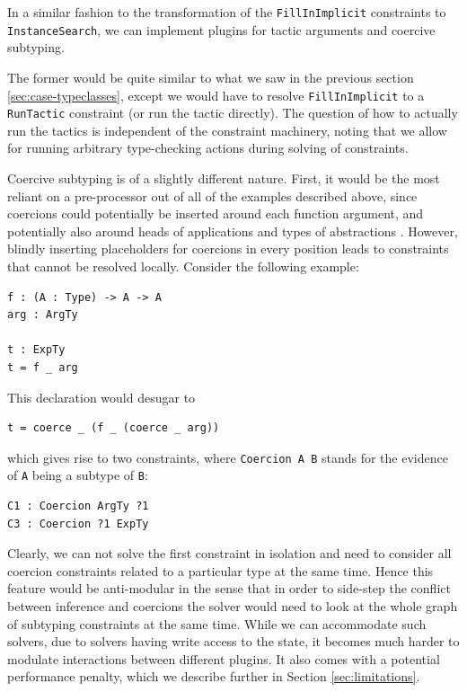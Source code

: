 In a similar fashion to the transformation of the
\texttt{FillInImplicit} constraints to \texttt{InstanceSearch}, we can
implement plugins for tactic arguments and coercive subtyping.

The former would be quite similar to what we saw in the previous section
\ref{sec:case-typeclasses}, except we would have to resolve
\texttt{FillInImplicit} to a \texttt{RunTactic} constraint (or run the
tactic directly). The question of how to actually run the tactics is
independent of the constraint machinery, noting that we allow for
running arbitrary type-checking actions during solving of constraints.

Coercive subtyping is of a slightly different nature. First, it would be
the most reliant on a pre-processor out of all of the examples described
above, since coercions could potentially be inserted around each
function argument, and potentially also around heads of applications and
types of abstractions \citep{tassiBiDirectionalRefinementAlgorithm2012}.
However, blindly inserting placeholders for coercions in every position
leads to constraints that cannot be resolved locally. Consider the
following example:

\begin{verbatim}
f : (A : Type) -> A -> A
arg : ArgTy

t : ExpTy
t = f _ arg
\end{verbatim}

This declaration would desugar to

\begin{verbatim}
t = coerce _ (f _ (coerce _ arg))
\end{verbatim}

which gives rise to two constraints, where \texttt{Coercion\ A\ B}
stands for the evidence of \texttt{A} being a subtype of \texttt{B}:

\begin{verbatim}
C1 : Coercion ArgTy ?1
C3 : Coercion ?1 ExpTy
\end{verbatim}

Clearly, we can not solve the first constraint in isolation and need to
consider all coercion constraints related to a particular type at the
same time. Hence this feature would be anti-modular in the sense that in
order to side-step the conflict between inference and coercions the
solver would need to look at the whole graph of subtyping constraints at
the same time. While we can accommodate such solvers, due to solvers
having write access to the state, it becomes much harder to modulate
interactions between different plugins. It also comes with a potential
performance penalty, which we describe further in Section
\ref{sec:limitations}.

